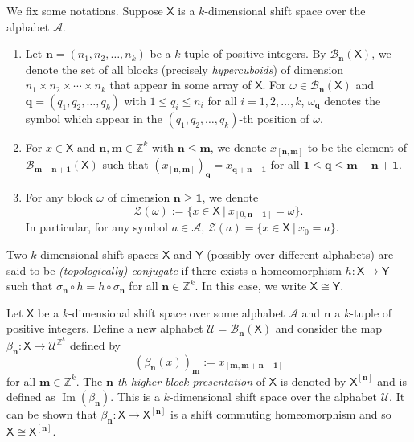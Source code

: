 \documentclass[a4paper,reqno,12pt]{amsart}
\newcommand{\N}{\mathbf{n}}
\newcommand{\M}{\mathbf{m}}
\newcommand{\Xs}{\mathsf{X}}
\theoremstyle{definition}
\theoremstyle{remark}
\newcommand{\image}{\operatorname{Im}}
\begin{document}
We fix some notations. Suppose $\Xs$ is a $k$-dimensional shift space over the alphabet $\mathcal{A}$. 
\begin{enumerate}
\item[$\bullet$] Let $\N=(n_1,n_2,\ldots,n_k)$ be a $k$-tuple of positive integers. By $\mathcal{B}_\N(\Xs)$, we denote the set of all blocks (precisely \emph{hypercuboids}) of dimension $n_1\times n_2\times \cdots \times n_k$ that appear in some array of $\Xs$. For $\omega\in \mathcal{B}_\N(\Xs)$ and $\mathbf{q}=(q_1,q_2,\ldots,q_k)$ with $1\le q_i\le n_i$ for all $i=1,2,\ldots,k$, $\omega_\mathbf{q}$ denotes the symbol which appear in the $(q_1,q_2,\ldots,q_k)$-th position of $\omega$. 

\item[$\bullet$] For $x\in \Xs$ and $\N,\M\in \mathbb{Z}^k$ with $\N\le \M$, we denote $x_{[\N,\M]}$ to be the element of $\mathcal{B}_{\M-\N+\mathbf{1}}(\Xs)$ such that $(x_{[\N,\M]})_\mathbf{q}=x_{\mathbf{q}+\N-\mathbf{1}}$ for all $\mathbf{1}\le \mathbf{q}\le \M-\N+\mathbf{1}$.  

\item[$\bullet$] For any block $\omega$ of dimension $\N\ge \mathbf{1}$, we denote \[\mathcal{Z}(\omega):=\{x\in \Xs~|~x_{[0,\N-\mathbf{1}]}=\omega\}.\] In particular, for any symbol $a\in \mathcal{A}$, $\mathcal{Z}(a)=\{x\in \Xs~|~x_0=a\}$. 
\end{enumerate}
Two $k$-dimensional shift spaces $\Xs$ and $\mathsf{Y}$ (possibly over different alphabets) are said to be \emph{(topologically) conjugate} if there exists a homeomorphism $h:\Xs\longrightarrow \mathsf{Y}$ such that $\sigma_\N \circ h=h\circ \sigma_\N$ for all $\N\in \mathbb{Z}^k$. In this case, we write $\Xs\cong \mathsf{Y}$.

Let $\Xs$ be a $k$-dimensional shift space over some alphabet $\mathcal{A}$ and $\N$ a $k$-tuple of positive integers. Define a new alphabet $\mathcal{U}=\mathcal{B}_\N(\Xs)$ and consider the map $\beta_\N:\Xs\longrightarrow \mathcal{U}^{\mathbb{Z}^k}$ defined by \[(\beta_\N(x))_\M:=x_{[\M,\M+\N-\mathbf{1}]}\] for all $\M\in \mathbb{Z}^k$. The \emph{$\N$-th higher-block presentation} of $\Xs$ is denoted by $\Xs^{[\N]}$ and is defined as $\image(\beta_\N)$. This is a $k$-dimensional shift space over the alphabet $\mathcal{U}$. It can be shown that $\beta_\N:\Xs\longrightarrow \Xs^{[\N]}$ is a shift commuting homeomorphism and so $\Xs\cong \Xs^{[\N]}$. 
\end{document}

